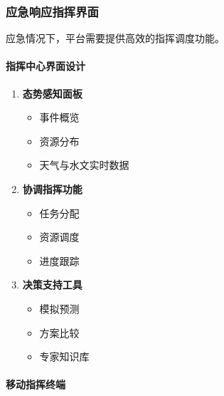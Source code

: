 \subsubsection{应急响应指挥界面}\label{ux5e94ux6025ux54cdux5e94ux6307ux6325ux754cux9762}

应急情况下，平台需要提供高效的指挥调度功能。

\paragraph{指挥中心界面设计}\label{ux6307ux6325ux4e2dux5fc3ux754cux9762ux8bbeux8ba1}

\begin{enumerate}
\def\labelenumi{\arabic{enumi}.}
\tightlist
\item
  \textbf{态势感知面板}

  \begin{itemize}
  \tightlist
  \item
    事件概览
  \item
    资源分布
  \item
    天气与水文实时数据
  \end{itemize}
\item
  \textbf{协调指挥功能}

  \begin{itemize}
  \tightlist
  \item
    任务分配
  \item
    资源调度
  \item
    进度跟踪
  \end{itemize}
\item
  \textbf{决策支持工具}

  \begin{itemize}
  \tightlist
  \item
    模拟预测
  \item
    方案比较
  \item
    专家知识库
  \end{itemize}
\end{enumerate}

\paragraph{移动指挥终端}\label{ux79fbux52a8ux6307ux6325ux7ec8ux7aef}

